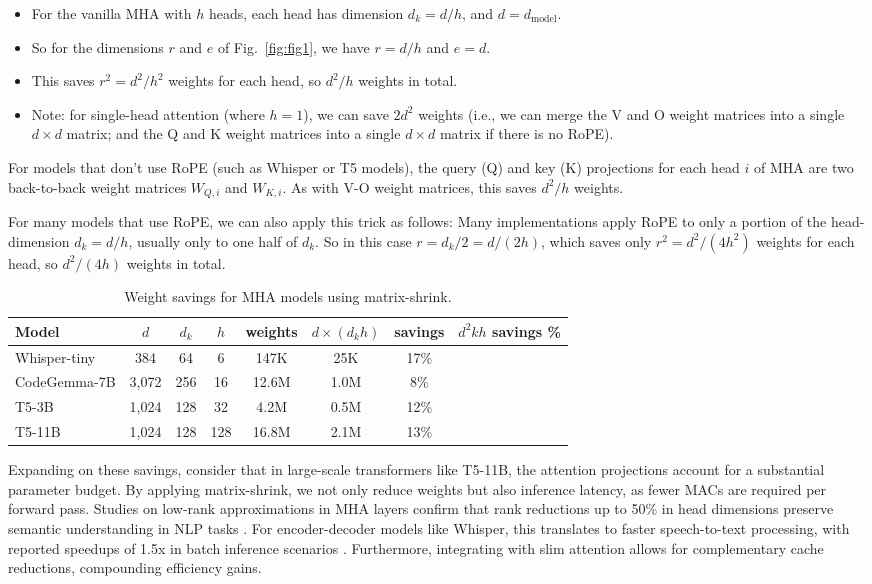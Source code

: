 \documentclass{article}
\begin{document}
\begin{itemize}
\item For the vanilla MHA with $h$ heads, each head has dimension $d_k = d/h$, and $d = d_{\text{model}}$.
\item So for the dimensions $r$ and $e$ of Fig.~\ref{fig:fig1}, we have $r = d/h$ and $e = d$.
\item This saves $r^{2} = d^{2}/h^{2}$ weights for each head, so $d^{2}/h$ weights in total.
\item Note: for single-head attention (where $h = 1$), we can save $2d^{2}$ weights (i.e., we can merge the V and O weight matrices into a single $d \times d$ matrix; and the Q and K weight matrices into a single $d \times d$ matrix if there is no RoPE).
\end{itemize}

For models that don’t use RoPE (such as Whisper \cite{radford2022whisper} or T5 models), the query (Q) and key (K) projections for each head $i$ of MHA are two back-to-back weight matrices $W_{Q,i}$ and $W_{K,i}$. As with V-O weight matrices, this saves $d^{2}/h$ weights.

For many models that use RoPE, we can also apply this trick as follows: Many implementations apply RoPE to only a portion of the head-dimension $d_k = d/h$, usually only to one half of $d_k$. So in this case $r = d_k/2 = d/(2h)$, which saves only $r^{2} = d^{2}/(4h^{2})$ weights for each head, so $d^{2}/(4h)$ weights in total.

\begin{table}[h]
\centering
\begin{tabular}{lccccccc}
\toprule
Model & $d$ & $d_k$ & $h$ & weights & $d \times (d_kh)$ & savings & $d^{2}kh$ savings \% \\
\midrule
Whisper-tiny & 384 & 64 & 6 & 147K & 25K & 17\% \\
CodeGemma-7B & 3,072 & 256 & 16 & 12.6M & 1.0M & 8\% \\
T5-3B & 1,024 & 128 & 32 & 4.2M & 0.5M & 12\% \\
T5-11B & 1,024 & 128 & 128 & 16.8M & 2.1M & 13\% \\
\bottomrule
\end{tabular}
\caption{Weight savings for MHA models using matrix-shrink.}
\label{tab:tab1}
\end{table}

Expanding on these savings, consider that in large-scale transformers like T5-11B, the attention projections account for a substantial parameter budget. By applying matrix-shrink, we not only reduce weights but also inference latency, as fewer MACs are required per forward pass. Studies on low-rank approximations in MHA layers confirm that rank reductions up to 50\% in head dimensions preserve semantic understanding in NLP tasks \cite{medium2023compressing}. For encoder-decoder models like Whisper, this translates to faster speech-to-text processing, with reported speedups of 1.5x in batch inference scenarios \cite{radford2022whisper}. Furthermore, integrating with slim attention \cite{graef2025slim} allows for complementary cache reductions, compounding efficiency gains.
\end{document}
